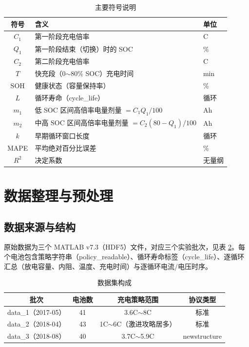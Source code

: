 \documentclass[withoutpreface]{cumcmthesis}
\begin{document}
\begin{table}[H]
\centering
\caption{主要符号说明}
\label{tab:symbol}
\begin{tabular}{cll}
\toprule
符号 & 含义 & 单位 \\
\midrule
$C_1$ & 第一阶段充电倍率 & C \\
$Q_1$ & 第一阶段结束（切换）时的 SOC & \% \\
$C_2$ & 第二阶段充电倍率 & C \\
$T$ & 快充段（0$\sim$80\% SOC）充电时间 & min \\
$\mathrm{SOH}$ & 健康状态（容量保持率） & \% \\
$L$ & 循环寿命（cycle\_life） & 循环 \\
$m_1$ & 低 SOC 区间高倍率电量剂量 $=C_1Q_1/100$ & Ah \\
$m_2$ & 中高 SOC 区间高倍率电量剂量 $=C_2(80-Q_1)/100$ & Ah \\
$k$ & 早期循环窗口长度 & 循环 \\
MAPE & 平均绝对百分比误差 & \% \\
$R^2$ & 决定系数 & 无量纲 \\
\bottomrule
\end{tabular}
\end{table}

\section{数据整理与预处理}

\subsection{数据来源与结构}

原始数据为三个 MATLAB v7.3（HDF5）文件，对应三个实验批次，见表 \ref{tab:data}。每个电池包含策略字符串（policy\_readable）、循环寿命标签（cycle\_life）、逐循环汇总（放电容量、内阻、温度、充电时间）与逐循环电流/电压时序。

\begin{table}[htbp]
\centering
\caption{数据集构成}
\label{tab:data}
\begin{tabular}{cccc}
\toprule
批次 & 电池数 & 充电策略范围 & 协议类型 \\
\midrule
data\_1（2017-05） & 41 & 3.6C$\sim$8C & 标准 \\
data\_2（2018-04） & 43 & 1C$\sim$6C（激进攻略居多） & 标准 \\
data\_3（2018-08） & 40 & 3.7C$\sim$5.9C & newstructure \\
\bottomrule
\end{tabular}
\end{table}
\end{document}
